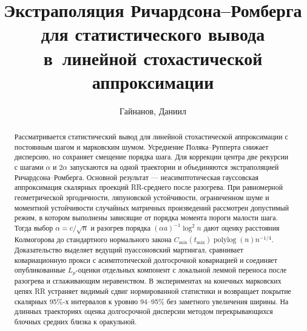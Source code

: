 
\Russian
\title[RR-экстраполяция в линейной стохастической аппроксимации]
{Экстраполяция Ричардсона--Ромберга для статистического вывода
в~линейной стохастической аппроксимации}

\author{Гайнанов, {Д}аниил}
\address{\href{https://www.hse.ru}{Национальный исследовательский университет
«Высшая школа экономики»}, Москва, Россия}

\begin{abstract}
Рассматривается статистический вывод для линейной стохастической аппроксимации
с постоянным шагом и марковским шумом. Усреднение Поляка--Рупперта снижает
дисперсию, но сохраняет смещение порядка шага. Для коррекции центра две
рекурсии с шагами $\alpha$ и $2\alpha$ запускаются на одной траектории и
объединяются экстраполяцией Ричардсона--Ромберга. Основной результат ---
неасимптотическая гауссовская аппроксимация скалярных проекций RR-среднего
после разогрева. При равномерной геометрической эргодичности, ляпуновской
устойчивости, ограниченном шуме и моментной устойчивости случайных матричных
произведений рассмотрен допустимый режим, в котором выполнены зависящие от
порядка момента пороги малости шага. Тогда выбор $\alpha=c/\sqrt n$ и разогрев
порядка $(\alpha a)^{-1}\log^2n$ дают оценку расстояния Колмогорова до
стандартного нормального закона
$C_{\mathrm{mix}}(t_{\mathrm{mix}})
\operatorname{polylog}(n)n^{-1/4}$. Доказательство выделяет ведущий
пуассоновский мартингал, сравнивает ковариационную прокси с асимптотической
долгосрочной ковариацией и соединяет опубликованные $L_p$-оценки отдельных
компонент с локальной леммой переноса после разогрева и сглаживающим
неравенством. В экспериментах на конечных марковских
цепях RR устраняет видимый сдвиг нормированной статистики и возвращает
покрытие скалярных 95\%-х интервалов к уровню 94--95\% без заметного
увеличения ширины. На длинных траекториях оценка долгосрочной дисперсии методом
перекрывающихся блочных средних близка к оракульной.
\end{abstract}

